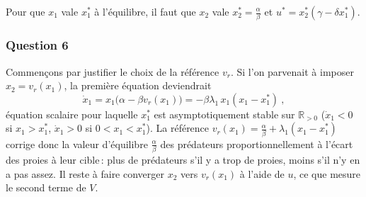 
Pour que \(x_1\) vale \(x_1^*\) à l'équilibre, il faut que \(x_2\) vale
\(x_2^* = \frac{\alpha}{\beta}\) et
\(u^* = x_2^*(\gamma-\delta x_1^*)\).

\hypertarget{answer-cycle-lim-volterra-6}{%
\subsubsection*{Question 6}\label{answer-cycle-lim-volterra-6}}


Commençons par justifier le choix de la référence \(v_r\). Si l'on
parvenait à imposer \(x_2 = v_r(x_1)\), la première équation deviendrait
\[
\dot{x}_1 = x_1\big(\alpha - \beta v_r(x_1)\big) = -\beta\lambda_1\, x_1 (x_1-x_1^*) \ ,
\] équation scalaire pour laquelle \(x_1^*\) est asymptotiquement stable
sur \(\mathbb{R}_{>0}\) (\(\dot{x}_1<0\) si \(x_1>x_1^*\), \(\dot{x}_1>0\)
si \(0<x_1<x_1^*\)). La référence \(v_r(x_1)=\frac{\alpha}{\beta}+\lambda_1(x_1-x_1^*)\)
corrige donc la valeur d'équilibre \(\frac{\alpha}{\beta}\) des
prédateurs proportionnellement à l'écart des proies à leur cible\,:
plus de prédateurs s'il y a trop de proies, moins s'il n'y en a pas
assez. Il reste à faire converger \(x_2\) vers \(v_r(x_1)\) à l'aide de
\(u\), ce que mesure le second terme de \(V\).

